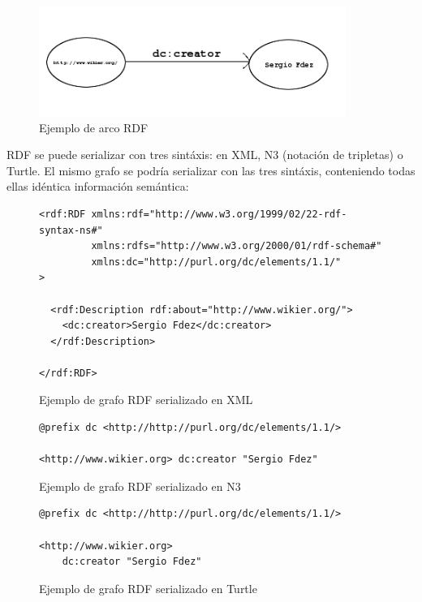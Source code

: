 \begin{figure}[H]
	\centering
	\includegraphics[width=10cm]{images/arc-example.png}
	\caption{Ejemplo de arco RDF}
	\label{fig:rdfTripletExample}
\end{figure}


RDF se puede serializar con tres sintáxis: en XML, N3 (notación de tripletas)
o Turtle. El mismo grafo se podría serializar con las tres sintáxis, conteniendo 
todas ellas idéntica información semántica:

\begin{figure}[H]
\lstset{language=XML}
\begin{lstlisting}
<rdf:RDF xmlns:rdf="http://www.w3.org/1999/02/22-rdf-syntax-ns#"
         xmlns:rdfs="http://www.w3.org/2000/01/rdf-schema#"
         xmlns:dc="http://purl.org/dc/elements/1.1/"
>

  <rdf:Description rdf:about="http://www.wikier.org/">
    <dc:creator>Sergio Fdez</dc:creator>
  </rdf:Description>

</rdf:RDF>
 \end{lstlisting}
 \caption{Ejemplo de grafo RDF serializado en XML}
 \label{fig:ejemplo.rdfxml}
\end{figure}

\begin{figure}[H]
\lstset{language=XML}
\begin{lstlisting}
@prefix dc <http://http://purl.org/dc/elements/1.1/>

<http://www.wikier.org> dc:creator "Sergio Fdez"
\end{lstlisting}
\caption{Ejemplo de grafo RDF serializado en N3}
\label{fig:ejemplo.rdfn3}
\end{figure}

\begin{figure}[H]
\lstset{language=XML}
\begin{lstlisting}
@prefix dc <http://http://purl.org/dc/elements/1.1/>

<http://www.wikier.org> 
	dc:creator "Sergio Fdez"
\end{lstlisting}
\caption{Ejemplo de grafo RDF serializado en Turtle}
\label{fig:ejemplo.rdfturtle}
\end{figure}


